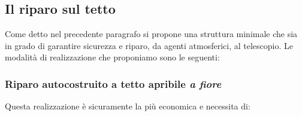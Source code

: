 \documentclass[a4paper,12pt]{article}
\begin{document}
\subsection{Il riparo sul tetto}
Come detto nel precedente paragrafo si propone una struttura minimale che sia in grado di garantire sicurezza e riparo, da agenti atmosferici, al telescopio. Le modalit\`a di realizzazione che proponiamo sono le seguenti:
\subsubsection{Riparo autocostruito a tetto apribile \textit{a fiore}}
Questa realizzazione \`e sicuramente la pi\`u economica e necessita di:
\end{document}
